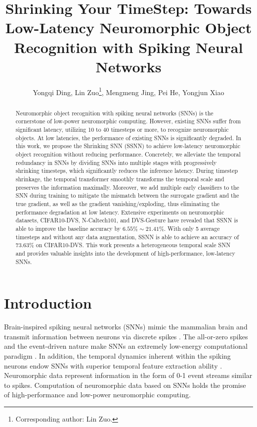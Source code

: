 \documentclass[letterpaper]{article} %
\title{Shrinking Your TimeStep: Towards Low-Latency Neuromorphic Object Recognition with Spiking Neural Networks}
\author{
    Yongqi Ding,
    Lin Zuo\thanks{Corresponding author: Lin Zuo.},
    Mengmeng Jing,
    Pei He,
    Yongjun Xiao
}
\begin{document}
\maketitle

\begin{abstract}
Neuromorphic object recognition with spiking neural networks (SNNs) is the cornerstone of low-power neuromorphic computing. However, existing SNNs suffer from significant latency, utilizing 10 to 40 timesteps or more, to recognize neuromorphic objects. At low latencies, the performance of existing SNNs is significantly degraded. In this work, we propose the Shrinking SNN (SSNN) to achieve low-latency neuromorphic object recognition without reducing performance. Concretely, we alleviate the temporal redundancy in SNNs by dividing SNNs into multiple stages with progressively shrinking timesteps, which significantly reduces the inference latency. During timestep shrinkage, the temporal transformer smoothly transforms the temporal scale and preserves the information maximally. Moreover, we add multiple early classifiers to the SNN during training to mitigate the mismatch between the surrogate gradient and the true gradient, as well as the gradient vanishing/exploding, thus eliminating the performance degradation at low latency. Extensive experiments on neuromorphic datasets, CIFAR10-DVS, N-Caltech101, and DVS-Gesture have revealed that SSNN is able to improve the baseline accuracy by $6.55\%\sim21.41\%$. With only 5 average timesteps and without any data augmentation, SSNN is able to achieve an accuracy of 73.63\% on CIFAR10-DVS. This work presents a heterogeneous temporal scale SNN and provides valuable insights into the development of high-performance, low-latency SNNs.
\end{abstract}

\section{Introduction}
Brain-inspired spiking neural networks (SNNs) mimic the mammalian brain and transmit information between neurons via discrete spikes \cite{MAASS19971659}. The all-or-zero spikes and the event-driven nature make SNNs an extremely low-energy computational paradigm \cite{DENG2020294}. In addition, the temporal dynamics inherent within the spiking neurons endow SNNs with superior temporal feature extraction ability \cite{zuo2020spiking,ponghiran_spiking_2022,PALIF}. Neuromorphic data represent information in the form of 0-1 event streams similar to spikes. Computation of neuromorphic data based on SNNs holds the promise of high-performance and low-power neuromorphic computing.
\end{document}
